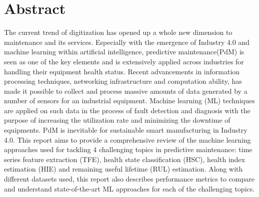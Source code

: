 %
\chapter*{Abstract}
\label{sec:abstract}

\vspace*{-10mm}

The current trend of digitization has opened up a whole new dimension to maintenance and its services. Especially with the emergence of Industry 4.0 and machine learning within artificial intelligence, predictive maintenance(PdM) is seen as one of the key elements and is
extensively applied across industries for handling their equipment health status. Recent advancements in information processing techniques, networking infrastructure and computation ability, has made it possible to collect and process massive amounts of data generated by a number of sensors for an industrial equipment. Machine learning (ML) techniques are applied on such data in the process of fault detection and diagnosis with the purpose of increasing the utilization rate and minimizing the downtime of equipments. PdM is inevitable for sustainable smart manufacturing in Industry 4.0. This report aims to provide a comprehensive review of the machine learning approaches used for tackling 4 challenging topics in predictive maintenance: time series feature extraction (TFE), health state classification (HSC), health index estimation (HIE) and remaining useful lifetime (RUL) estimation. Along with different datasets used, this report also describes performance metrics to compare and understand state-of-the-art ML approaches for each of the challenging topics.

